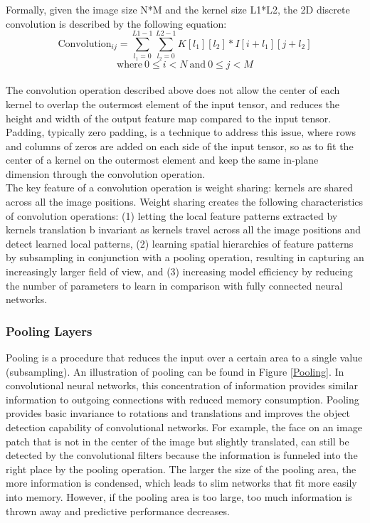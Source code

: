 Formally, given the image size N*M and the kernel size L1*L2, the 2D discrete convolution is described by the following equation: \\

\begin{equation}
  \text{Convolution}_{ij} = \sum_{l_1=0}^{L1-1} \sum_{l_2=0}^{L2-1} K[l_1][l_2]*I[i+l_1][j+l_2]
\end{equation}
$$\text{where} \ 0 \leq i < N \ \text{and} \ 0 \leq j < M$$ \\

The convolution operation described above does not allow the center of each kernel to overlap the outermost element of the input tensor, and reduces the height and width of the output feature map compared to the input tensor. Padding, typically zero padding, is a technique to address this issue, where rows and columns of zeros are added on each side of the input tensor, so as to fit the center of a kernel on the outermost element and keep the same in-plane dimension through the convolution operation. \\

The key feature of a convolution operation is weight sharing: kernels are shared across all the image positions. Weight sharing creates the following characteristics of convolution operations: (1) letting the local feature patterns extracted by kernels translation b invariant as kernels travel across all the image positions and detect learned local patterns, (2) learning spatial hierarchies of feature patterns by subsampling in conjunction with a pooling operation, resulting in capturing an increasingly larger field of view, and (3) increasing model efficiency by reducing the number of parameters to learn in comparison with fully connected neural networks. \\


\subsubsection*{Pooling Layers}

Pooling is a procedure that reduces the input over a certain area to a single value (subsampling). An illustration of pooling can be found in Figure \ref{Pooling}. In convolutional neural networks, this concentration of information provides similar information to outgoing connections with reduced memory consumption. Pooling provides basic invariance to rotations and translations and improves the object detection capability of convolutional networks. For example, the face on an image patch that is not in the center of the image but slightly translated, can still be detected by the convolutional filters because the information is funneled into the right place by the pooling operation. The larger the size of the pooling area, the more information is condensed, which leads to slim networks that fit more easily into memory. However, if the pooling area is too large, too much information is thrown away and predictive performance decreases. \\

